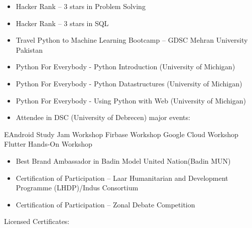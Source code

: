 \documentclass[10pt,a4paper,ragged2e,withhyper]{altacv}
\begin{document}
\begin{paracol}{2}
\divider



\begin{itemize}
\item Hacker Rank -- 3 stars in Problem Solving
\item Hacker Rank -- 3 stars in SQL
\item Travel Python to Machine Learning Bootcamp -- GDSC Mehran University Pakistan
\item Python For Everybody - Python Introduction (University of Michigan)
\item Python For Everybody - Python Datastructures (University of Michigan)
\item Python For Everybody - Using Python with Web (University of Michigan)
\item Attendee in DSC (University of Debrecen) major events:
\end{itemize}
\begin{outline}
\2 EAndroid Study Jam Workshop
\2 Firbase Workshop
\2 Google Cloud Workshop
\2 Flutter Hands-On Workshop
\end{outline}         
	 
\begin{itemize}
\item Best Brand Ambassador in Badin Model United Nation(Badin MUN)
\item      Certification of Participation – Laar Humanitarian and Development Programme (LHDP)/Indus Consortium
\item      Certification of Participation – Zonal Debate Competition 
\end{itemize}
Licensed Certificates:

\divider










\end{paracol}
\end{document}
